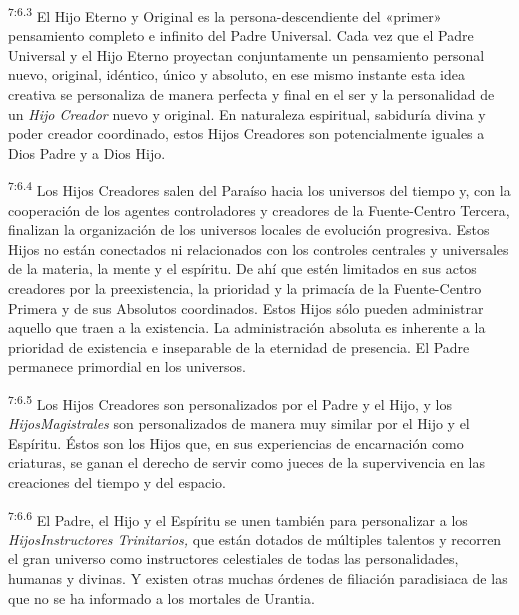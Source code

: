 \par
\textsuperscript{7:6.3} El Hijo Eterno y Original es la persona-descendiente del «primer» pensamiento completo e infinito del Padre Universal. Cada vez que el Padre Universal y el Hijo Eterno proyectan conjuntamente un pensamiento personal nuevo, original, idéntico, único y absoluto, en ese mismo instante esta idea creativa se personaliza de manera perfecta y final en el ser y la personalidad de un \textit{Hijo Creador} nuevo y original. En naturaleza espiritual, sabiduría divina y poder creador coordinado, estos Hijos Creadores son potencialmente iguales a Dios Padre y a Dios Hijo.

\par
\textsuperscript{7:6.4} Los Hijos Creadores salen del Paraíso hacia los universos del tiempo y, con la cooperación de los agentes controladores y creadores de la Fuente-Centro Tercera, finalizan la organización de los universos locales de evolución progresiva. Estos Hijos no están conectados ni relacionados con los controles centrales y universales de la materia, la mente y el espíritu. De ahí que estén limitados en sus actos creadores por la preexistencia, la prioridad y la primacía de la Fuente-Centro Primera y de sus Absolutos coordinados. Estos Hijos sólo pueden administrar aquello que traen a la existencia. La administración absoluta es inherente a la prioridad de existencia e inseparable de la eternidad de presencia. El Padre permanece primordial en los universos.

\par
\textsuperscript{7:6.5} Los Hijos Creadores son personalizados por el Padre y el Hijo, y los \textit{HijosMagistrales} son personalizados de manera muy similar por el Hijo y el Espíritu.
Éstos son los Hijos que, en sus experiencias de encarnación como criaturas, se ganan el derecho de servir como jueces de la supervivencia en las creaciones del tiempo y del espacio.

\par
\textsuperscript{7:6.6} El Padre, el Hijo y el Espíritu se unen también para personalizar a los \textit{HijosInstructores Trinitarios,} que están dotados de múltiples talentos y recorren el gran universo como instructores celestiales de todas las personalidades, humanas y divinas. Y existen otras muchas órdenes de filiación paradisiaca de las que no se ha informado a los mortales de Urantia.

